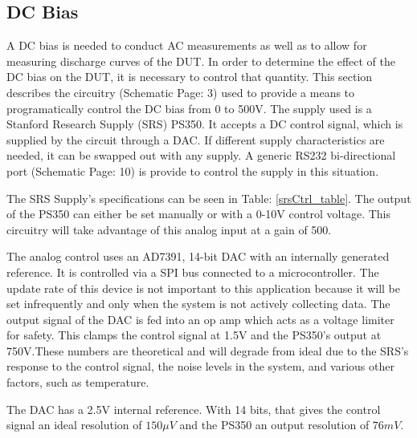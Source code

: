 \subsection {DC Bias}

A DC bias is needed to conduct AC measurements as well as to allow for measuring discharge curves of the DUT. In order to determine the effect of the DC bias on the DUT, it is necessary to control that quantity. This section describes the circuitry (Schematic Page: 3) used to provide a means to programatically control the DC bias from 0 to 500V. The supply used is a Stanford Research Supply (SRS) PS350. It accepts a DC control signal, which is supplied by the circuit through a DAC. If different supply characteristics are needed, it can be swapped out with any supply. A generic RS232 bi-directional port (Schematic Page: 10) is provide to control the supply in this situation.



The SRS Supply's specifications can be seen in Table: \ref{srsCtrl_table}. The output of the PS350 can either be set manually or with a 0-10V control voltage. This circuitry will take advantage of this analog input at a gain of 500. 

The analog control uses an AD7391, 14-bit DAC with an internally generated reference. It is controlled via a SPI bus connected to a microcontroller. The update rate of this device is not important to this application because it will be set infrequently and only when the system is not actively collecting data. The output signal of the DAC is fed into an op amp which acts as a voltage limiter for safety. This clamps the control signal at 1.5V and the PS350's output at 750V.These numbers are theoretical and will degrade from ideal due to the SRS's response to the control signal, the noise levels in the system, and various other factors, such as temperature.

The DAC has a 2.5V internal reference. With 14 bits, that gives the control signal an ideal resolution of $150\mu V$ and the PS350 an output resolution of $76mV$.


